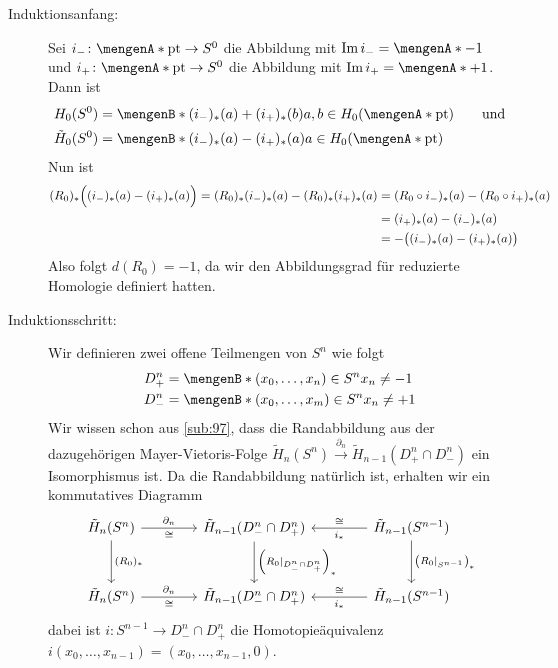 \begin{description}
	\item[Induktionsanfang:] Sei $i_- \colon \set{\mathrm{pt}} \to S^0$ die Abbildung mit $\im i_- = \set{-1}$ und $i_+ \colon\set{\mathrm{pt}} \to S^0 $ die Abbildung mit 
	$\im i_+ = \set{+1}$. Dann ist 
	\begin{align*}
		H_0(S^0) &= \set[(i_-)_*(a)+ (i_+)_*(b)]{a,b \in H_0(\set{\mathrm{pt}})\rule{0cm}{1em}} \qquad \text{und}\\
		\tilde{H}_0(S^0) &= \set[(i_-)_*(a)- (i_+)_*(a)]{a \in H_0(\set{\mathrm{pt}})\rule{0cm}{1em}}
	\end{align*}
	Nun ist
	\begin{align*}
		(R_0)_* \enbrace[\Big]{(i_-)_*(a)- (i_+)_*(a)} = (R_0)_* (i_-)_* (a) - (R_0)_* (i_+)_* (a) &= (R_0 \circ i_-)_*(a) - (R_0 \circ i_+)_*(a)\\ 
		&= (i_+)_*(a) - (i_-)_*(a) \\ 
		&= - \enbrace[\big]{(i_-)_*(a) - (i_+)_*(a)} 
	\end{align*}
	Also folgt $d(R_0)=-1$, da wir den Abbildungsgrad für reduzierte Homologie definiert hatten.
	\item[Induktionsschritt:] Wir definieren zwei offene Teilmengen von $S^n$ wie folgt 
	\begin{align*}
		D_+^n &= \set[(x_0, \ldots , x_n) \in S^n]{x_n \not= -1}\\
		D_-^n &= \set[(x_0, \ldots , x_m) \in S^n]{x_n \not= +1}  
	\end{align*}
	Wir wissen schon aus \ref{sub:97}, dass die Randabbildung aus der dazugehörigen Mayer-Vietoris-Folge 
	$\tilde{H}_n(S^n) \xrightarrow{\partial_n} \tilde{H}_{n-1}(D^n_+ \cap D_-^n)$ ein Isomorphismus ist. Da die Randabbildung natürlich ist, erhalten wir ein kommutatives 
	Diagramm
	\[
		\begin{tikzcd}[row sep=3em, column sep=4em]
			\tilde{H}_n(S^n) \rar["\partial_n","\cong"'] \dar["(R_0)_*"]
			& \tilde{H}_{n-1}(D^n_- \cap D^n_+) \dar["\enbrace*{R_0|_{D^n_- \cap D^n_+}}_*"]  
			& \tilde{H}_{n-1}(S^{n-1}) \lar["i_*","\cong"'] \dar["\enbrace*{R_0|_{S^{n-1}}}_*"]\\
			\tilde{H}_n(S^n) \rar["\partial_n","\cong"']
			& \tilde{H}_{n-1}(D^n_- \cap D^n_+) 
			& \tilde{H}_{n-1}(S^{n-1}) \lar["i_*","\cong"']
		\end{tikzcd}
	\]
	dabei ist $i\colon S^{n-1} \to D^n_- \cap D_+^n$ die Homotopieäquivalenz $i(x_0, \ldots , x_{n-1}) = (x_0, \ldots , x_{n-1},0)$.

\end{description}
